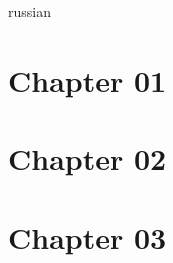 \documentclass[12pt,twocolumn]{article}
\begin{document}
\begin{center}
\begin{otherlanguage*}{russian}

\section*{Chapter 01}


\section*{Chapter 02}


\section*{Chapter 03}


\end{otherlanguage*}
\end{center}
\end{document}
